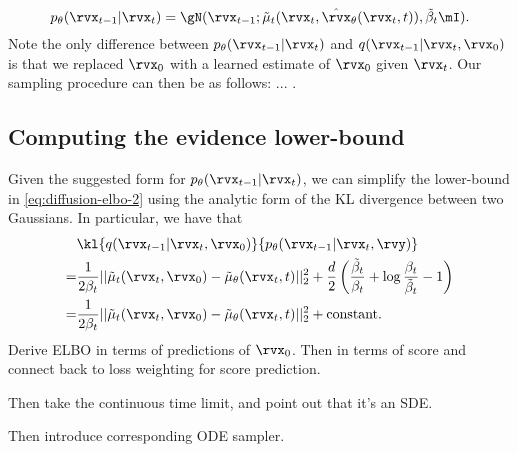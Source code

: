 \begin{equation}
    p_\theta(\rvx_{t-1}|\rvx_t) = \gN ( \rvx_{t-1} ; \tilde{\mathbf{\mu}}_t(\rvx_t,\hat{\rvx}_\theta(\rvx_t, t)), \tilde{\beta}_t \mI ).
\end{equation}
Note the only difference between $p_\theta(\rvx_{t-1}|\rvx_t)$ and $q(\rvx_{t-1}|\rvx_t, \rvx_0)$ is that we replaced $\rvx_0$ with a learned estimate of $\rvx_0$ given $\rvx_t$. Our sampling procedure can then be as follows: ... .

\subsection{Computing the evidence lower-bound}
Given the suggested form for $p_\theta(\rvx_{t-1}|\rvx_t)$, we can simplify the lower-bound in \cref{eq:diffusion-elbo-2} using the analytic form of the KL divergence between two Gaussians. In particular, we have that
\begin{align}
    &\kl{q(\rvx_{t-1}|\rvx_t,\rvx_0)}{p_\theta(\rvx_{t-1}|\rvx_t, \rvy)} \\
    =& \frac{1}{2 \beta_t} ||\tilde{\mathbf{\mu}}_t(\rvx_t,\rvx_0) - \tilde{\mathbf{\mu}}_\theta(\rvx_t, t)||_2^2 + \frac{d}{2} \left( \frac{\tilde{\beta}_t}{\beta_t} + \log\frac{\beta_t}{\tilde{\beta}_t} - 1 \right) \\
    =& \frac{1}{2 \beta_t} ||\tilde{\mathbf{\mu}}_t(\rvx_t,\rvx_0) - \tilde{\mathbf{\mu}}_\theta(\rvx_t, t)||_2^2 + \text{constant}.
\end{align}
Derive ELBO in terms of predictions of $\rvx_0$. Then in terms of score and connect back to loss weighting for score prediction.

Then take the continuous time limit, and point out that it's an SDE.

Then introduce corresponding ODE sampler.


